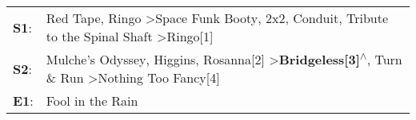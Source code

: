 \begin{supertabular}{p{0.03\textwidth}p{0.92\textwidth}}
 \textbf{S1}:  &  Red Tape\textsuperscript{}, \enspace Ringo\textsuperscript{} \textgreater \enspace Space Funk Booty\textsuperscript{}, \enspace 2x2\textsuperscript{}, \enspace Conduit\textsuperscript{}, \enspace Tribute to the Spinal Shaft\textsuperscript{} \textgreater \enspace Ringo[1]\textsuperscript{}  \enspace  \\
 \textbf{S2}:  &           Mulche's Odyssey\textsuperscript{}, \enspace Higgins\textsuperscript{}, \enspace Rosanna[2]\textsuperscript{} \textgreater \enspace \textbf{Bridgeless[3]\textsuperscript{$\wedge$}}, \enspace Turn \& Run\textsuperscript{} \textgreater \enspace Nothing Too Fancy[4]\textsuperscript{}  \enspace  \\
 \textbf{E1}:  &                                                                                                                                                                                                                                                                  Fool in the Rain\textsuperscript{}  \enspace  \\
\end{supertabular}
